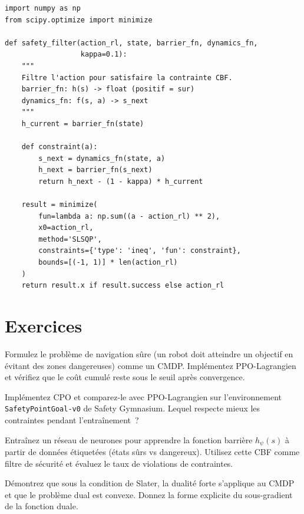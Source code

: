 \begin{codeblock}[title=\textbf{Filtre de s\'ecurit\'e simple}]
\begin{verbatim}
import numpy as np
from scipy.optimize import minimize

def safety_filter(action_rl, state, barrier_fn, dynamics_fn,
                  kappa=0.1):
    """
    Filtre l'action pour satisfaire la contrainte CBF.
    barrier_fn: h(s) -> float (positif = sur)
    dynamics_fn: f(s, a) -> s_next
    """
    h_current = barrier_fn(state)

    def constraint(a):
        s_next = dynamics_fn(state, a)
        h_next = barrier_fn(s_next)
        return h_next - (1 - kappa) * h_current

    result = minimize(
        fun=lambda a: np.sum((a - action_rl) ** 2),
        x0=action_rl,
        method='SLSQP',
        constraints={'type': 'ineq', 'fun': constraint},
        bounds=[(-1, 1)] * len(action_rl)
    )
    return result.x if result.success else action_rl
\end{verbatim}
\end{codeblock}

\section{Exercices}

\begin{exercice}
Formulez le probl\`eme de navigation s\^ure (un robot doit atteindre un objectif
en \'evitant des zones dangereuses) comme un CMDP. Impl\'ementez PPO-Lagrangien
et v\'erifiez que le co\^ut cumul\'e reste sous le seuil apr\`es convergence.
\end{exercice}

\begin{exercice}[CPO]
Impl\'ementez CPO et comparez-le avec PPO-Lagrangien sur l'environnement
\texttt{SafetyPointGoal-v0} de Safety Gymnasium. Lequel respecte mieux les
contraintes pendant l'entra\^inement~?
\end{exercice}

\begin{exercice}
Entra\^inez un r\'eseau de neurones pour apprendre la fonction barri\`ere $h_\psi(s)$
\`a partir de donn\'ees \'etiquet\'ees (\'etats s\^urs vs dangereux). Utilisez cette
CBF comme filtre de s\'ecurit\'e et \'evaluez le taux de violations de contraintes.
\end{exercice}

\begin{exercice}[Th\'eorie]
D\'emontrez que sous la condition de Slater, la dualit\'e forte s'applique
au CMDP et que le probl\`eme dual est convexe. Donnez la forme explicite
du sous-gradient de la fonction duale.
\end{exercice}
